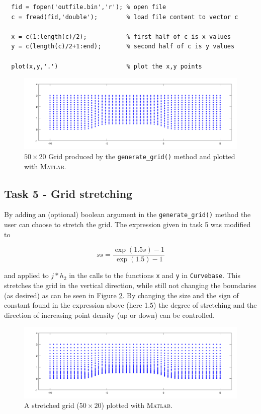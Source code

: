 \documentclass[paper=a4, fontsize=12pt]{article} %
\begin{document}
\begin{lstlisting}
  fid = fopen('outfile.bin','r'); % open file
  c = fread(fid,'double');        % load file content to vector c

  x = c(1:length(c)/2);           % first half of c is x values
  y = c(length(c)/2+1:end);       % second half of c is y values

  plot(x,y,'.')                   % plot the x,y points

\end{lstlisting}
\begin{figure}[H]
  \centering
  \includegraphics[width=\textwidth]{task4.pdf}
  \caption{\small $50\times 20$ Grid produced by the \texttt{generate\_grid()} method and plotted with \textsc{Matlab.}\label{fig:grid}}
\end{figure}

\subsection*{Task 5 - Grid stretching}


By adding an (optional) boolean argument in the \texttt{generate\_grid()} method the user can choose to stretch the grid. The expression given in task 5 was modified to

$$ ss = \frac{\exp(1.5s)-1}{\exp(1.5)-1}$$

and applied to $j*h_2$ in the calls to the functions \texttt{x} and \texttt{y} in \texttt{Curvebase}. This stretches the grid in the vertical direction, while still not changing the boundaries (as desired) as can be seen in Figure \ref{fig:stretched}. By changing the size and the sign of constant found in the expression above (here 1.5) the degree of stretching and the direction of increasing point density (up or down) can be controlled.

\begin{figure}[H]
  \centering
  \includegraphics[width=\textwidth]{task5.pdf}
  \caption{\small A stretched grid ($50\times 20$) plotted with \textsc{Matlab.}\label{fig:stretched}}
\end{figure}
\end{document}
